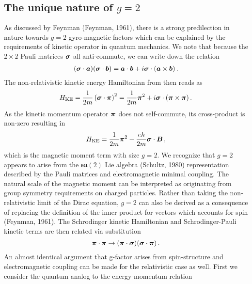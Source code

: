 \subsection{The unique nature of $g=2$}
\label{sec:unique}
As discussed by Feynman (Feynman, 1961), there is a strong predilection in nature towards $g=2$ gyro-magnetic factors which can be explained by the requirements of kinetic operator in quantum mechanics. We note that because the $2\times2$ Pauli matrices $\boldsymbol{\sigma}$ all anti-commute, we can write down the relation
\begin{alignat}{1}
	\label{nat:1} (\boldsymbol{\sigma}\cdot\boldsymbol{a})(\boldsymbol{\sigma}\cdot\boldsymbol{b})=\boldsymbol{a}\cdot\boldsymbol{b}+i\boldsymbol{\sigma}\cdot(\boldsymbol{a}\times\boldsymbol{b})\,.
\end{alignat}
The non-relativistic kinetic energy Hamiltonian from  then reads as
\begin{alignat}{1}
	\label{nat:2} {H}_{\mathrm{KE}}=\frac{1}{2m}\left(\boldsymbol{\sigma}\cdot\boldsymbol{\pi}\right)^{2}=\frac{1}{2m}\boldsymbol{\pi}^{2}+i\boldsymbol{\sigma}\cdot(\boldsymbol{\pi}\times\boldsymbol{\pi})\,.
\end{alignat}
As the kinetic momentum operator $\boldsymbol{\pi}$ does not self-commute, its cross-product is non-zero resulting in
\begin{alignat}{1}
	\label{nat:3} {H}_{\mathrm{KE}}=\frac{1}{2m}\boldsymbol{\pi}^{2}-\frac{e\hbar}{2m}\boldsymbol{\sigma}\cdot\boldsymbol{B}\,,
\end{alignat}
which is the magnetic moment term with size $g=2$. We recognize that $g=2$ appears to arise from the $\mathfrak{su}(2)$ Lie algebra (Schultz, 1980) representation described by the Pauli matrices and electromagnetic minimal coupling. The natural scale of the magnetic moment can be interpreted as originating from group symmetry requirements on charged particles. Rather than taking the non-relativistic limit of the Dirac equation, $g=2$ can also be derived as a consequence of replacing the definition of the inner product for vectors which accounts for spin (Feynman, 1961). The Schrodinger kinetic Hamiltonian and Schrodinger-Pauli kinetic terms are then related via substitution
\begin{alignat}{1}
	\label{nat:4} \boldsymbol{\pi}\cdot\boldsymbol{\pi} \rightarrow (\boldsymbol{\pi}\cdot\boldsymbol{\sigma})(\boldsymbol{\sigma}\cdot\boldsymbol{\pi})\,.
\end{alignat}
An almost identical argument that g-factor arises from spin-structure and electromagnetic coupling can be made for the relativistic case as well. First we consider the quantum analog to the energy-momentum relation
